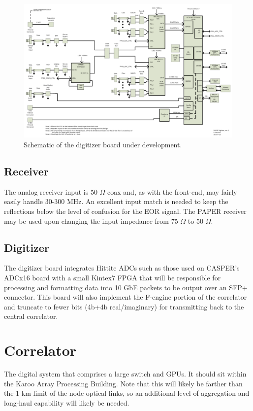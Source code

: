 \documentclass[11pt]{article}
\begin{document}
\begin{figure}[H]
\centering
\includegraphics[width=\textwidth]{herald.png}
\caption{Schematic of the digitizer board under development.}
\label{fig:herald}
\end{figure}

\subsection{Receiver}
The analog receiver input is 50 $\Omega$ coax and, as with the front-end, may fairly easily handle 30-300 MHz.  An excellent input match is needed to keep the reflections below the level of confusion for the EOR signal.  The PAPER receiver may be used upon changing the input impedance from 75 $\Omega$ to 50 $\Omega$.

\subsection{Digitizer}
The digitizer board integrates Hittite ADCs
such as those used on CASPER's ADCx16 board with a small Kintex7 FPGA
that will be responsible for processing and formatting data into 10 GbE packets to be output
over an SFP+ connector.  This board will also implement the F-engine portion of the correlator and truncate to fewer bits (4b+4b real/imaginary) for transmitting back to the central correlator.

\section{Correlator}
The digital system that comprises a large switch and GPUs.  It should sit within the Karoo Array Processing
Building.  Note that this will likely be farther than the 1 km limit of the
node optical links, so an additional level of aggregation and long-haul
capability will likely be needed.
\end{document}
